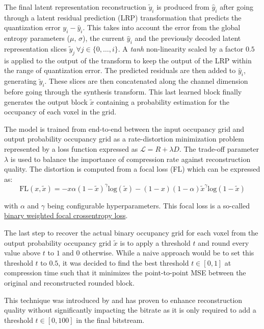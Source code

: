 The final latent representation reconstruction $\tilde{y}_i$ is produced from $\hat{y}_i$ after going through a latent residual prediction (LRP) transformation that predicts the quantization error $y_i - \hat{y}_i$. This takes into account the error from the global entropy parameters ($\mu,\,\sigma$), the current $\hat{y}_i$ and the previously decoded latent representation slices $\tilde{y}_j\,\forall j \in \{0,\dots,i\}$. A \textit{tanh} non-linearity scaled by a factor $0.5$ is applied to the output of the transform to keep the output of the LRP within the range of quantization error. 
The predicted residuals are then added to $\hat{y}_i$, generating $\tilde{y}_i$.
These slices are then concatenated along the channel dimension before going through the synthesis transform. This last learned block finally generates the output block $\tilde{x}$ containing a probability estimation for the occupancy of each voxel in the grid.

The model is trained from end-to-end between the input occupancy grid and output probability occupancy grid as a rate-distortion minimization problem represented by a loss function expressed as $\mathcal{L} = R + \lambda D$. The trade-off parameter $\lambda$ is used to balance the importance of compression rate against reconstruction quality. 
The distortion is computed from a focal loss (FL) which can be expressed as: 
$$
\text{FL}(x, \tilde{x}) = -x \alpha (1-\tilde{x})^{\gamma} \text{log}(\tilde{x}) - (1-x) (1-\alpha) \tilde{x}^{\gamma} \text{log}(1-\tilde{x})
$$

\noindent with $\alpha$ and $\gamma$ being configurable hyperparameters. This focal loss is a so-called \href{https://www.tensorflow.org/api_docs/python/tf/keras/losses/BinaryFocalCrossentropy}{binary weighted focal crossentropy loss}.

The last step to recover the actual binary occupancy grid for each voxel from the output probability occupancy grid $\tilde{x}$ is to apply a threshold $t$ and round every value above $t$ to $1$ and $0$ otherwise. While a naive approach would be to set this threshold $t$ to $0.5$, it was decided to find the best threshold $t \in [0,1]$ at compression time such that it minimizes the point-to-point MSE \cite{bib:8296925} between the original and reconstructed rounded block.

This technique was introduced by \cite{bib:9287077} and has proven to enhance reconstruction quality without significantly impacting the bitrate as it is only required to add a threshold $t \in [0,100]$ in the final bitstream.
